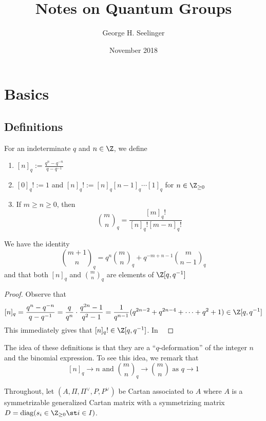 \documentclass[11pt,leqno,oneside]{amsart}
\title[Notes on Quantum Groups]{Notes on Quantum Groups}
\author{George H. Seelinger}
\date{November 2018}
\numberwithin{thm}{section}
\newcommand{\weightlattice}{P}
\renewcommand{\simpleroots}{\Pi}
\newcommand{\qfactorial}[1]{[#1]_q!}
\newcommand{\qbinom}[3][q]{\binom{#2}{#3}_{#1}}
\DeclareMathOperator{\diag}{diag}
\begin{document}
\maketitle
\section{Basics}
\subsection{Definitions}
\begin{defn}
  For an indeterminate \(q\) and \(n \in \Z\), we define
  \begin{enumerate}
  \item \([n]_q := \frac{q^n-q^{-n}}{q-q^{-1}}\)
  \item \(\qfactorial{0} := 1\) and \(\qfactorial{n} := [n]_q [n-1]_q
    \cdots [1]_q\) for \(n \in \Z_{\geq 0}\)
  \item If \(m \geq n \geq 0\), then \[
      \qbinom{m}{n} = \frac{\qfactorial{m}}{\qfactorial{n}\qfactorial{m-n}}
    \]
  \end{enumerate}
\end{defn}
\begin{prop}
  We have the identity \[
    \qbinom{m+1}{n} = q^n \qbinom{m}{n} + q^{-m+n-1} \qbinom{m}{n-1}
  \]
  and that both \([n]_q\) and \(\qbinom{m}{n}\) are elements of
  \(\Z[q,q^{-1}]\) 
\end{prop}
\begin{proof}
  Observe that \[
    [n]_q = \frac{q^n-q^{-n}}{q-q^{-1}} = \frac{q}{q^n}\cdot
    \frac{q^{2n}-1}{q^2-1} =
    \frac{1}{q^{n-1}}(q^{2n-2}+q^{2n-4}+\cdots+q^2+1) \in \Z[q,q^{-1}]
  \]
  This immediately gives that \(\qfactorial{n} \in \Z[q,q^{-1}]\). In \
\end{proof}
The idea of these definitions is that they are a ``\(q\)-deformation''
of the integer \(n\) and the binomial expression. To see this idea,
we remark that \[
  [n]_q \to n \text{ and }\qbinom{m}{n} \to \binom{m}{n} \text{ as }q
  \to 1
\]
\begin{defn}
  Throughout, let \((A, \simpleroots, \simpleroots^\vee, \weightlattice,
  \weightlattice^\vee)\) be Cartan associated to \(A\) where \(A\) is
  a symmetrizable generalized Cartan matrix with a symmetrizing matrix
  \(D = \diag(s_i \in \Z_{\geq 0} \st i \in I)\).
\end{defn}
\end{document}
